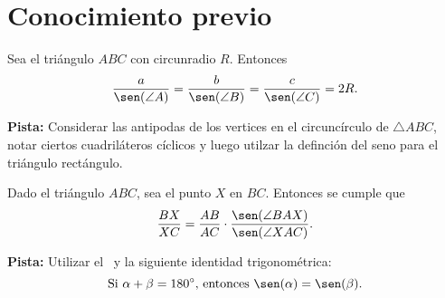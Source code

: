 \section{Conocimiento previo}

\begin{section-theorem.tcb}\label{law-of-sines}
    Sea el triángulo $ABC$ con circunradio $R$.
    Entonces
    \[
        \frac{a}{\sen(\angle A)} = \frac{b}{\sen(\angle B)} = \frac{c}{\sen(\angle C)} = 2R.
    \]
\end{section-theorem.tcb}

\textbf{Pista:} Considerar las antipodas de los vertices en el circuncírculo de $\triangle ABC$, notar ciertos cuadriláteros cíclicos y luego utilzar la definción del seno para el triángulo rectángulo.

\begin{section-theorem.tcb}\label{ratio-lemma}
    Dado el triángulo $ABC$, sea el punto $X$ en $BC$.
    Entonces se cumple que
    \[
        \frac{BX}{XC} = \frac{AB}{AC} \cdot \frac{\sen(\angle BAX)}{\sen(\angle XAC)}.
    \]
\end{section-theorem.tcb}

\textbf{Pista:} Utilizar el~ y la siguiente identidad trigonométrica:
\[
    \text{Si}\ \alpha + \beta = 180^\circ\text{,}\ \text{entonces}\ \sen(\alpha) = \sen(\beta).
\]